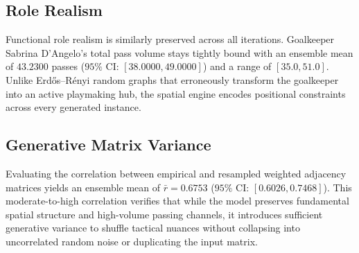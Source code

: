 \documentclass[12pt, a4paper]{article}
\begin{document}
\subsection{Role Realism}
\label{subsec:role_realism}

Functional role realism is similarly preserved across all iterations. Goalkeeper Sabrina D’Angelo’s total pass volume stays tightly bound with an ensemble mean of $43.2300$ passes ($95\%$ CI: $[38.0000, 49.0000]$) and a range of $[35.0, 51.0]$. Unlike Erd{\H{o}}s--R{\'e}nyi random graphs that erroneously transform the goalkeeper into an active playmaking hub, the spatial engine encodes positional constraints across every generated instance.

\subsection{Generative Matrix Variance}
\label{subsec:matrix_variance}

Evaluating the correlation between empirical and resampled weighted adjacency matrices yields an ensemble mean of $\bar{r} = 0.6753$ ($95\%$ CI: $[0.6026, 0.7468]$). This moderate-to-high correlation verifies that while the model preserves fundamental spatial structure and high-volume passing channels, it introduces sufficient generative variance to shuffle tactical nuances without collapsing into uncorrelated random noise or duplicating the input matrix.
\end{document}
